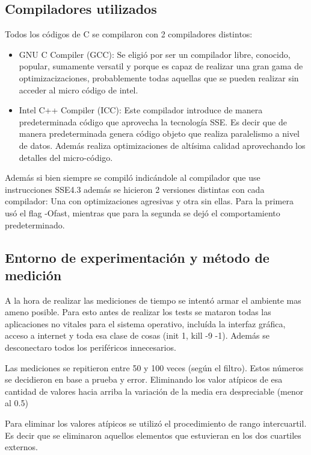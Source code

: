 \subsection{Compiladores utilizados}
			
Todos los códigos de C se compilaron con 2 compiladores distintos:

\begin{itemize}
	\item GNU C Compiler (GCC): Se eligió por ser un compilador libre, conocido, popular, sumamente versatil y porque es capaz de realizar una gran gama de optimizacizaciones, probablemente todas aquellas que se pueden realizar sin acceder al micro código de intel.

	\item Intel C++ Compiler (ICC): Este compilador introduce de manera predeterminada código que aprovecha la tecnología SSE. Es decir que de manera predeterminada genera código objeto que realiza paralelismo a nivel de datos. Además realiza optimizaciones de altísima calidad aprovechando los detalles del micro-código.

\end{itemize} 
				
Además si bien siempre se compiló indicándole al compilador que use instrucciones SSE4.3 además se hicieron 2 versiones distintas con cada compilador: Una con optimizaciones agresivas y otra sin ellas. Para la primera usó el flag -Ofast, mientras que para la segunda se dejó el comportamiento predeterminado.


\subsection{Entorno de experimentación y método de medición}

	A la hora de realizar las mediciones de tiempo se intentó armar el ambiente mas
ameno posible. Para esto antes de realizar los tests se mataron todas las aplicaciones
no vitales para el sistema operativo, incluída la interfaz gráfica, acceso a internet y
toda esa clase de cosas (init 1, kill -9 -1). Además se desconectaro todos los periféricos
innecesarios.

	Las mediciones se repitieron entre 50 y 100 veces (según el filtro). Estos números se
decidieron en base a prueba y error. Eliminando los valor atípicos de esa cantidad
de valores hacia arriba la variación de la media era despreciable (menor al 0.5)

	Para eliminar los valores atípicos se utilizó el procedimiento de rango intercuartil. Es decir
que se eliminaron aquellos elementos que estuvieran en los dos cuartiles externos.


